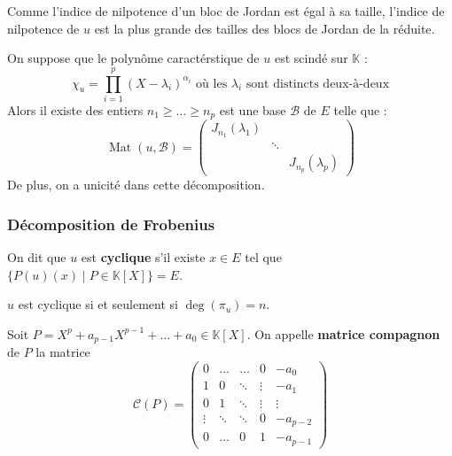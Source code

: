 	\begin{remark}
		Comme l'indice de nilpotence d'un bloc de Jordan est égal à sa taille, l'indice de nilpotence de $u$ est la plus grande des tailles des blocs de Jordan de la réduite.
	\end{remark}


	\begin{theorem}
		On suppose que le polynôme caractérstique de $u$ est scindé sur $\mathbb{K}$ :
		\[ \chi_u = \prod_{i=1}^p (X - \lambda_i)^{\alpha_i} \text{ où les } \lambda_i \text{ sont distincts deux-à-deux} \]
		Alors il existe des entiers $n_1 \geq \dots \geq n_p$ est une base $\mathcal{B}$ de $E$ telle que :
		\[ \operatorname{Mat}(u, \mathcal{B}) = \begin{pmatrix} J_{n_1}(\lambda_1) & & \\ & \ddots & \\ & & J_{n_p}(\lambda_p) \end{pmatrix} \]
		De plus, on a unicité dans cette décomposition.
	\end{theorem}

	\subsubsection{Décomposition de Frobenius}


	\begin{definition}
		On dit que $u$ est \textbf{cyclique} s'il existe $x \in E$ tel que $\{ P(u)(x) \mid P \in \mathbb{K}[X] \} = E$.
	\end{definition}

	\begin{proposition}
		$u$ est cyclique si et seulement si $\deg(\pi_u) = n$.
	\end{proposition}

	\begin{definition}
		Soit $P = X^p + a_{p-1} X^{p-1} + \dots + a_0 \in \mathbb{K}[X]$. On appelle \textbf{matrice compagnon} de $P$ la matrice
		\[ \mathcal{C}(P) = \begin{pmatrix} 0 & \dots & \dots & 0 & -a_0 \\ 1 & 0 & \ddots & \vdots & -a_1 \\ 0 & 1 & \ddots & \vdots & \vdots \\ \vdots & \ddots & \ddots & 0 & -a_{p-2} \\ 0 & \dots & 0 & 1 & -a_{p-1} \end{pmatrix} \]
	\end{definition}

